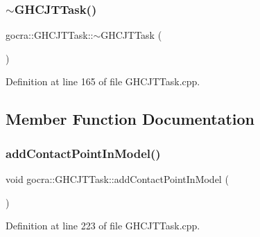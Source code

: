 \hypertarget{classgocra_1_1GHCJTTask_a258ac19e0b4a3aab26b4aebfeb2c26d8}{}\label{classgocra_1_1GHCJTTask_a258ac19e0b4a3aab26b4aebfeb2c26d8} 
\subsubsection{\texorpdfstring{$\sim$\+G\+H\+C\+J\+T\+Task()}{~GHCJTTask()}}
{\footnotesize\ttfamily gocra\+::\+G\+H\+C\+J\+T\+Task\+::$\sim$\+G\+H\+C\+J\+T\+Task (\begin{DoxyParamCaption}{ }\end{DoxyParamCaption})\hspace{0.3cm}{\ttfamily [virtual]}}



Definition at line 165 of file G\+H\+C\+J\+T\+Task.\+cpp.



\subsection{Member Function Documentation}
\hypertarget{classgocra_1_1GHCJTTask_aee61104908f043c77611e2b3b573d103}{}\label{classgocra_1_1GHCJTTask_aee61104908f043c77611e2b3b573d103} 
\subsubsection{\texorpdfstring{add\+Contact\+Point\+In\+Model()}{addContactPointInModel()}}
{\footnotesize\ttfamily void gocra\+::\+G\+H\+C\+J\+T\+Task\+::add\+Contact\+Point\+In\+Model (\begin{DoxyParamCaption}{ }\end{DoxyParamCaption})\hspace{0.3cm}{\ttfamily [protected]}}



Definition at line 223 of file G\+H\+C\+J\+T\+Task.\+cpp.

\hypertarget{classgocra_1_1GHCJTTask_a70e6514d810197ee94af36959061982e}{}\label{classgocra_1_1GHCJTTask_a70e6514d810197ee94af36959061982e} 
